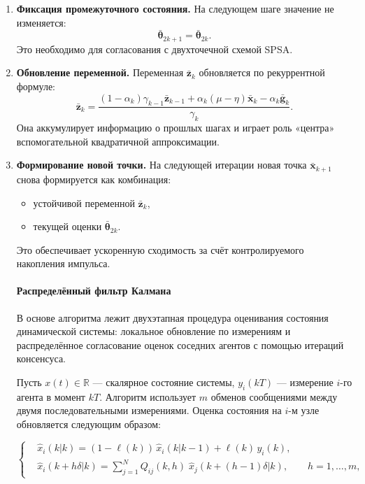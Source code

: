 \begin{enumerate}
\item \textbf{Фиксация промежуточного состояния.}  
На следующем шаге значение не изменяется:
\[
\bar{\boldsymbol{\theta}}_{2k+1} = \bar{\boldsymbol{\theta}}_{2k}.
\]
Это необходимо для согласования с двухточечной схемой SPSA.

\item \textbf{Обновление переменной.}  
Переменная $\bar{\mathbf{z}}_k$ обновляется по рекуррентной формуле:
\[
\bar{\mathbf{z}}_k = \dfrac{(1 - \alpha_k)\gamma_{k-1}\bar{\mathbf{z}}_{k-1}
+ \alpha_k (\mu - \eta)\bar{\mathbf{x}}_k
- \alpha_k \bar{\mathbf{g}}_k}{\gamma_k}.
\]
Она аккумулирует информацию о прошлых шагах и играет роль «центра» вспомогательной квадратичной аппроксимации.

\item \textbf{Формирование новой точки.}  
На следующей итерации новая точка $\bar{\mathbf{x}}_{k+1}$ снова формируется как комбинация:
\begin{itemize}
    \item устойчивой переменной $\bar{\mathbf{z}}_k$,
    \item текущей оценки $\bar{\boldsymbol{\theta}}_{2k}$.
\end{itemize}
Это обеспечивает ускоренную сходимость за счёт контролируемого накопления импульса.


\paragraph{Распределённый фильтр Калмана}

В основе алгоритма лежит двухэтапная процедура оценивания состояния динамической системы: 
локальное обновление по измерениям и распределённое согласование оценок 
соседних агентов с помощью итераций консенсуса.

Пусть $x(t) \in \mathbb{R}$ — скалярное состояние системы, $y_i(kT)$ — измерение $i$-го агента в момент $kT$. 
Алгоритм использует $m$ обменов сообщениями между двумя последовательными измерениями. 
Оценка состояния на $i$-м узле обновляется следующим образом:

\[
\left\{
\begin{aligned}
  &\hat{x}_i(k|k) = (1 - \ell(k))\,\hat{x}_i(k|k-1) + \ell(k)\,y_i(k), \\[0.5em]
  &\hat{x}_i(k + h\delta|k) = \sum_{j=1}^{N} Q_{ij}(k,h)\;\hat{x}_j(k + (h-1)\delta|k), \qquad h = 1,\dots,m,
\end{aligned}
\right.
\]


\end{enumerate}
